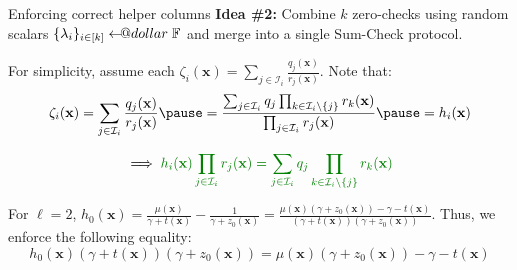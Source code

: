 \documentclass{zkdl-presentation-template}
\makeatletter
\newcommand\leftarrowS{\leftarrow\joinrel\smalldollar}
\newcommand{\smalldollar}{\mathrel{\mathpalette\small@dollar\relax}}
\newcommand{\small@dollar}[2]{%
  \vcenter{\hbox{%
    $#1\textnormal{\fontsize{0.7\dimexpr\f@size pt}{0}\selectfont\$}$%
  }}%
}
\makeatother
\begin{document}
    \begin{frame}{Enforcing correct helper columns}
        \textbf{Idea \#2:} Combine $k$ zero-checks using random scalars
        $\{\lambda_i\}_{i \in [k]} \leftarrowS \mathbb{F}$ and merge into a
        single Sum-Check protocol.\pause

        For simplicity, assume each $\zeta_i(\mathbf{x}) = \sum_{j \in
        \mathcal{I}_i} \frac{q_j(\mathbf{x})}{r_j(\mathbf{x})}$. Note that:
        \begin{equation*}
            \zeta_i(\mathbf{x}) = \sum_{j \in
        \mathcal{I}_i} \frac{q_j(\mathbf{x})}{r_j(\mathbf{x})} \pause = 
        \frac{\sum_{j \in \mathcal{I}_i}q_j\prod_{k \in \mathcal{I}_i \setminus \{j\}}r_k(\mathbf{x})}{\prod_{j \in \mathcal{I}_i}r_j(\mathbf{x})} \pause = h_i(\mathbf{x})
        \end{equation*}
        
        \vspace{-30px}

        \pause\begin{equation*}
            \implies \textcolor{green!50!black}{h_i(\mathbf{x})\prod_{j \in \mathcal{I}_i}r_j(\mathbf{x}) = \sum_{j \in \mathcal{I}_i}q_j\prod_{k \in \mathcal{I}_i \setminus \{j\}}r_k(\mathbf{x})}
        \end{equation*}

        \pause\begin{example}
            For $\ell=2$, $h_0(\mathbf{x}) = \frac{\mu(\mathbf{x})}{\gamma+t(\mathbf{x})} - \frac{1}{\gamma+z_0(\mathbf{x})} = \frac{\mu(\mathbf{x})(\gamma+z_0(\mathbf{x})) - \gamma - t(\mathbf{x})}{(\gamma+t(\mathbf{x}))(\gamma+z_0(\mathbf{x}))}$. Thus, we enforce
            the following equality:\pause
            \begin{equation*}
                h_0(\mathbf{x})(\gamma+t(\mathbf{x}))(\gamma+z_0(\mathbf{x})) = \mu(\mathbf{x})(\gamma+z_0(\mathbf{x})) - \gamma - t(\mathbf{x})
            \end{equation*}
        \end{example}
    \end{frame}
\end{document}

